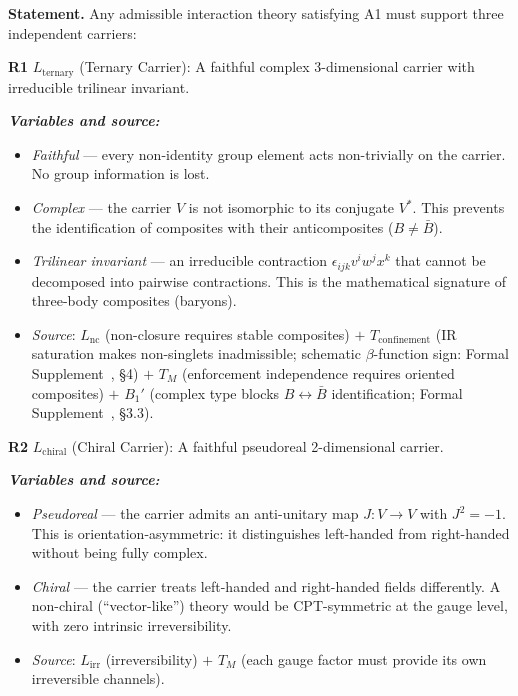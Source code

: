 \documentclass[11pt]{article}
\newenvironment{varlist}{\begin{itemize}[nosep,leftmargin=2em]}{\end{itemize}}
\begin{document}
\begin{tcolorbox}[apfbox, title={Theorem R: Representation Requirements from Admissibility}]
\textbf{Statement.}  Any admissible interaction theory satisfying A1 must support three independent carriers:

\medskip
\textbf{R1} $L_{\mathrm{ternary}}$ (Ternary Carrier): A faithful complex 3-dimensional carrier with irreducible trilinear invariant.

\smallskip\noindent\textbf{\textit{Variables and source:}}
\begin{varlist}
\item \textit{Faithful} --- every non-identity group element acts non-trivially on the carrier.  No group information is lost.
\item \textit{Complex} --- the carrier $V$ is not isomorphic to its conjugate $V^*$.  This prevents the identification of composites with their anticomposites ($B \ne \bar{B}$).
\item \textit{Trilinear invariant} --- an irreducible contraction $\epsilon_{ijk} v^i w^j x^k$ that cannot be decomposed into pairwise contractions.  This is the mathematical signature of three-body composites (baryons).
\item \textit{Source}: $L_{\mathrm{nc}}$ (non-closure requires stable composites) $+$ $T_{\mathrm{confinement}}$ (IR saturation makes non-singlets inadmissible; schematic $\beta$-function sign: Formal Supplement~\cite{BrookeP2Supplement}, \S4) $+$ $T_M$ (enforcement independence requires oriented composites) $+$ $B_1'$ (complex type blocks $B \leftrightarrow \bar{B}$ identification; Formal Supplement~\cite{BrookeP2Supplement}, \S3.3).
\end{varlist}

\medskip
\textbf{R2} $L_{\mathrm{chiral}}$ (Chiral Carrier): A faithful pseudoreal 2-dimensional carrier.

\smallskip\noindent\textbf{\textit{Variables and source:}}
\begin{varlist}
\item \textit{Pseudoreal} --- the carrier admits an anti-unitary map $J: V \to V$ with $J^2 = -1$.  This is orientation-asymmetric: it distinguishes left-handed from right-handed without being fully complex.
\item \textit{Chiral} --- the carrier treats left-handed and right-handed fields differently.  A non-chiral (``vector-like'') theory would be CPT-symmetric at the gauge level, with zero intrinsic irreversibility.
\item \textit{Source}: $L_{\mathrm{irr}}$ (irreversibility) $+$ $T_M$ (each gauge factor must provide its own irreversible channels).
\end{varlist}


\end{tcolorbox}
\end{document}
